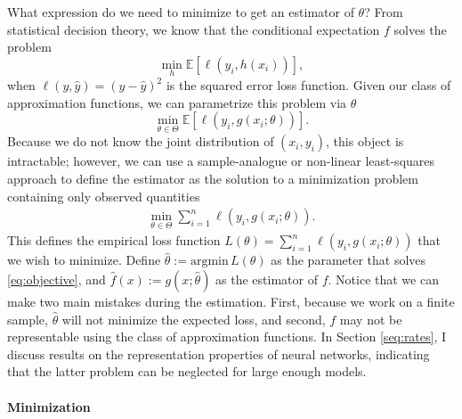 What expression do we need to minimize to get an estimator of $\theta$? From statistical
decision theory, we know that the conditional expectation $f$ solves the problem
\[
    \min_h \mathbb{E}\left[\ell\left(y_i, h(x_i)\right) \right],
\]
when $\ell(y, \hat{y}) = (y - \hat{y})^2$ is the squared error loss function. Given our
class of approximation functions, we can parametrize this problem via $\theta$
\[
    \min_{\theta \in \Theta} \mathbb{E}\left[\ell\left(y_i, g(x_i; \theta)\right) \right].
\]
Because we do not know the joint distribution of $(x_i, y_i)$, this object is
intractable; however, we can use a sample-analogue or non-linear least-squares approach
to define the estimator as the solution to a minimization problem containing only
observed quantities
\begin{align}
    \min_{\theta \in \Theta} \sum_{i = 1}^n \ell\left(y_i, g(x_i; \theta)\right).
    \tag{MP}
    \label{eq:objective}
\end{align}
This defines the empirical loss function $L(\theta) = \sum_{i = 1}^n \ell\left(y_i,
g(x_i; \theta)\right)$ that we wish to minimize. Define $\hat{\theta} := \text{argmin}
\, L(\theta)$ as the parameter that solves \ref{eq:objective}, and $\hat{f}(x) := g(x;
\hat{\theta})$ as the estimator of $f$. Notice that we can make two main mistakes during
the estimation. First, because we work on a finite sample, $\hat{\theta}$ will not
minimize the expected loss, and second, $f$ may not be representable using the class of
approximation functions. In Section \ref{seq:rates}, I discuss results on the
representation properties of neural networks, indicating that the latter problem can be
neglected for large enough models.

\paragraph{Minimization}


